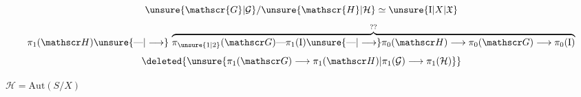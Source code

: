 
\[
 \unsure{\mathscr{G}|\mathcal G}/\unsure{\mathscr{H}|\mathcal H}\simeq\unsure{\mathrm{I}|X|\mathfrak X}
\]
\[
 \pi_1(\mathscr H)\unsure{\text{---}|\longrightarrow}\,
 \overbrace{\pi_{\unsure{1|2}}(\mathscr G)\text{---}\pi_1(\mathrm I)\unsure{\text{---}|\longrightarrow}
 \pi_0(\mathscr H)\longrightarrow\pi_0(\mathscr G)\longrightarrow\pi_0(\mathrm I)}^{??}
\]
\[
 \deleted{\unsure{\pi_1(\mathscr G)\longrightarrow\pi_1(\mathscr H)|\pi_1(\mathcal G)\longrightarrow\pi_1(\mathcal H)}}
\]

$\mathscr H=\mathrm{Aut}(S/X)$

